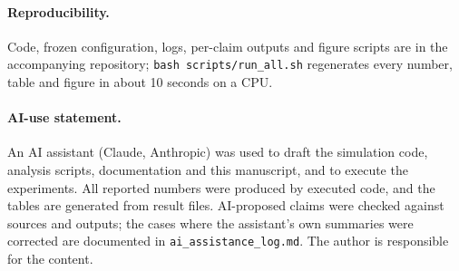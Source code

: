 \documentclass[10pt]{article}
\begin{document}
\paragraph{Reproducibility.} Code, frozen configuration, logs, per-claim outputs and figure scripts are in the accompanying repository; \texttt{bash scripts/run\_all.sh} regenerates every number, table and figure in about 10 seconds on a CPU.

\paragraph{AI-use statement.} An AI assistant (Claude, Anthropic) was used to draft the simulation code, analysis scripts, documentation and this manuscript, and to execute the experiments. All reported numbers were produced by executed code, and the tables are generated from result files. AI-proposed claims were checked against sources and outputs; the cases where the assistant's own summaries were corrected are documented in \texttt{ai\_assistance\_log.md}. The author is responsible for the content.



\end{document}
